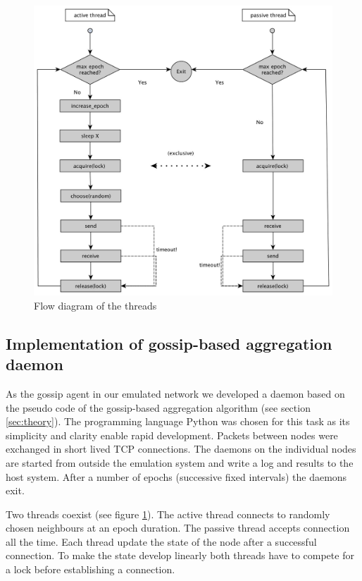 \begin{figure}[h!]
    \begin{center}
        \includegraphics[scale=0.25]{flow_diag.jpg}
    \end{center}
    \caption{Flow diagram of the threads}
    \label{fig:flow_diag}
\end{figure}

\subsection{Implementation of gossip-based aggregation daemon}
As the gossip agent in our emulated network we developed a daemon based on the pseudo code of the gossip-based aggregation algorithm (see section \ref{sec:theory}). The programming language Python \cite{python} was chosen for this task as its simplicity and clarity enable rapid development. Packets between nodes were exchanged in short lived TCP connections. The daemons on the individual nodes are started from outside the emulation system and write a log and results to the host system. After a number of epochs (successive fixed intervals) the daemons exit.

Two threads coexist (see figure \ref{fig:flow_diag}). The active thread connects to randomly chosen neighbours at an epoch duration. The passive thread accepts connection all the time. Each thread update the state of the node after a successful connection. To make the state develop linearly both threads have to compete for a lock before establishing a connection. %

